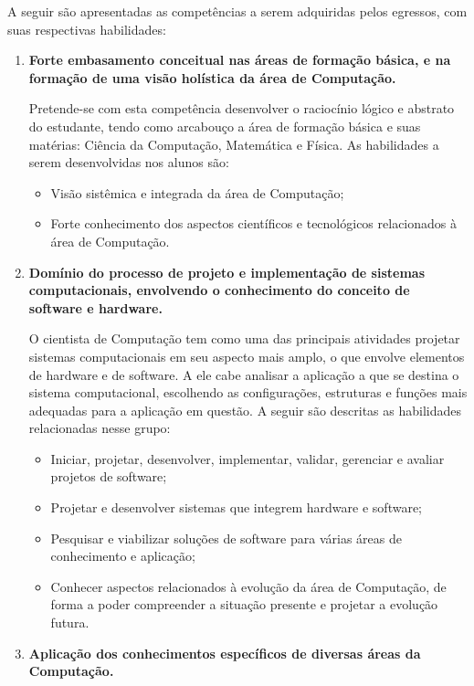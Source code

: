 A seguir são apresentadas as competências a serem adquiridas pelos egressos,
com suas respectivas habilidades:
\begin{enumerate}
    \item \textbf{Forte embasamento conceitual nas áreas de formação básica, e
    na formação de uma visão holística da área de Computação.}

    Pretende-se com esta competência desenvolver o raciocínio lógico e abstrato
    do estudante, tendo como arcabouço a área de formação básica e suas
    matérias: Ciência da Computação, Matemática e Física.
    As habilidades a serem desenvolvidas nos alunos são:
    \begin{itemize}
        \item Visão sistêmica e integrada da área de Computação;
        \item Forte conhecimento dos aspectos científicos e tecnológicos
        relacionados à área de Computação.
    \end{itemize}

    \item \textbf{Domínio do processo de projeto e implementação de sistemas
    computacionais, envolvendo o conhecimento do conceito de software e
    hardware.}

    O cientista de Computação tem como uma das principais atividades projetar
    sistemas computacionais em seu aspecto mais amplo, o que envolve elementos
    de hardware e de software. A ele cabe analisar a aplicação a que se destina
    o sistema computacional, escolhendo as configurações, estruturas e funções
    mais adequadas para a aplicação em questão.
    A seguir são descritas as habilidades relacionadas nesse grupo:
    \begin{itemize}
        \item Iniciar, projetar, desenvolver, implementar, validar, gerenciar e
        avaliar projetos de software;
        \item Projetar e desenvolver sistemas que integrem hardware e software;
        \item Pesquisar e viabilizar soluções de software para várias áreas de
        conhecimento e aplicação;
        \item Conhecer aspectos relacionados à evolução da área de Computação,
        de forma a poder compreender a situação presente e projetar a evolução
        futura.
    \end{itemize}

    \item \textbf{Aplicação dos conhecimentos específicos de diversas áreas da
    Computação.}


\end{enumerate}
